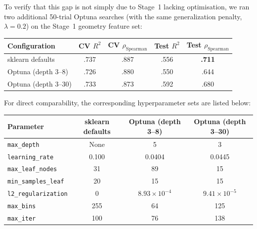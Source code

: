 \documentclass[11pt,a4paper]{article}
\newcommand{\Rtwo}{R^{2}}
\newcommand{\rhoS}{\rho_{\text{Spearman}}}
\begin{document}
To verify that this gap is not simply due to Stage~1 lacking optimisation, we
ran two additional 50-trial Optuna searches (with the same generalization
penalty, $\lambda = 0.2$) on the Stage~1 geometry feature set:

\begin{center}
      \small
      \begin{tabular}{lcccc}
            \toprule
            Configuration        & CV $\Rtwo$ & CV $\rhoS$ & Test $\Rtwo$ & Test $\rhoS$  \\
            \midrule
            sklearn defaults     & .737       & .887       & .556         & \textbf{.711} \\
            Optuna (depth 3--8)  & .726       & .880       & .550         & .644          \\
            Optuna (depth 3--30) & .733       & .873       & .592         & .680          \\
            \bottomrule
      \end{tabular}
\end{center}

For direct comparability, the corresponding hyperparameter sets are listed
below:

\begin{center}
      \small
      \begin{tabular}{lccc}
            \toprule
            Parameter                   & sklearn defaults & Optuna (depth 3--8) & Optuna (depth 3--30) \\
            \midrule
            \texttt{max\_depth}         & None             & 5                   & 3                    \\
            \texttt{learning\_rate}     & 0.100            & 0.0404              & 0.0445               \\
            \texttt{max\_leaf\_nodes}   & 31               & 89                  & 15                   \\
            \texttt{min\_samples\_leaf} & 20               & 15                  & 15                   \\
            \texttt{l2\_regularization} & 0                & $8.93\times10^{-4}$ & $9.41\times10^{-5}$  \\
            \texttt{max\_bins}          & 255              & 64                  & 125                  \\
            \texttt{max\_iter}          & 100              & 76                  & 138                  \\
            \bottomrule
      \end{tabular}
\end{center}
\end{document}
